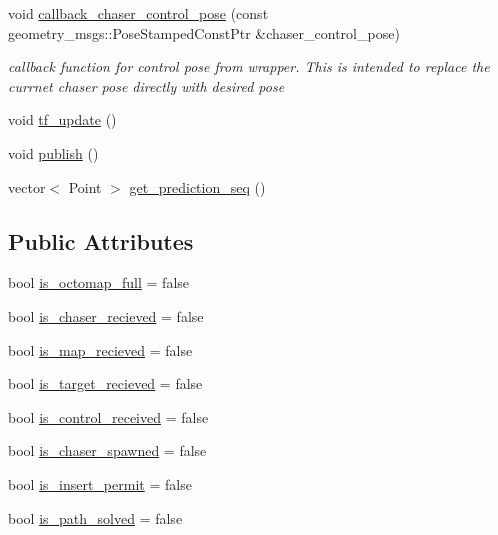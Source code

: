 \begin{DoxyCompactItemize}
\item 
void \hyperlink{class_objects_handler_a28ac9c7ef998a413825cddca78324f61}{callback\+\_\+chaser\+\_\+control\+\_\+pose} (const geometry\+\_\+msgs\+::\+Pose\+Stamped\+Const\+Ptr \&chaser\+\_\+control\+\_\+pose)
\begin{DoxyCompactList}\small\item\em callback function for control pose from wrapper. This is intended to replace the currnet chaser pose directly with desired pose \end{DoxyCompactList}\item 
void \hyperlink{class_objects_handler_a6896e4f9863bd1a4fbc8498d0cb20f09}{tf\+\_\+update} ()
\item 
void \hyperlink{class_objects_handler_a16cf7fca3059a03da4ec795f2af7fb74}{publish} ()
\item 
vector$<$ Point $>$ \hyperlink{class_objects_handler_a4793f1ed257c849b28f0386f635ee714}{get\+\_\+prediction\+\_\+seq} ()
\end{DoxyCompactItemize}
\subsection*{Public Attributes}
\begin{DoxyCompactItemize}
\item 
bool \hyperlink{class_objects_handler_a56f70ac04c01e8b948a4b44fa5670f49}{is\+\_\+octomap\+\_\+full} = false
\item 
bool \hyperlink{class_objects_handler_a86f8528ff5697c87fc6a3fcd6ba0f42c}{is\+\_\+chaser\+\_\+recieved} = false
\item 
bool \hyperlink{class_objects_handler_acf1ef1b318defc2a39d87cea72689478}{is\+\_\+map\+\_\+recieved} = false
\item 
bool \hyperlink{class_objects_handler_a7691f3e1ec58e55ead30c50c555f169a}{is\+\_\+target\+\_\+recieved} = false
\item 
bool \hyperlink{class_objects_handler_a88fb913340c535df81f3b7ae5f06df61}{is\+\_\+control\+\_\+received} = false
\item 
bool \hyperlink{class_objects_handler_a16165ae7c0167ba8d2a0151a8a4fbfd5}{is\+\_\+chaser\+\_\+spawned} = false
\item 
bool \hyperlink{class_objects_handler_acaefe98eb412d4c32cda2bf0bd602ae7}{is\+\_\+insert\+\_\+permit} = false
\item 
bool \hyperlink{class_objects_handler_ad8d1ea6646024f0a03e154a7c2c07682}{is\+\_\+path\+\_\+solved} = false
\end{DoxyCompactItemize}
